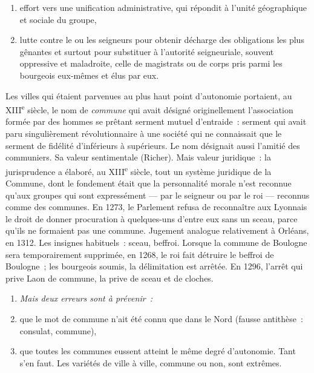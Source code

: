 \documentclass[french,twoside]{book} %
\newlength{\listmod}
\newcommand{\listhead}[1]{\hspace{-1\listmod}\emph{#1}}
\begin{document}
\begin{enumerate}[itemsep=0pt,]
\item effort vers une unification administrative, qui répondit à l’unité géographique et sociale du groupe,
\item lutte contre le ou les seigneurs pour obtenir décharge des obligations les plus gênantes et surtout pour substituer à l’autorité seigneuriale, souvent oppressive et maladroite, celle de magistrats ou de corps pris parmi les bourgeois eux-mêmes et élus par eux.
\end{enumerate}

\noindent Les villes qui étaient parvenues au plus haut point d’autonomie portaient, au XIII\textsuperscript{e} siècle, le nom de {\itshape commune} qui avait désigné originellement l’association formée par des hommes se prêtant serment mutuel d’entraide : serment qui avait paru singulièrement révolutionnaire à une société qui ne connaissait que le serment de fidélité d’inférieurs à supérieurs. Le nom désignait aussi l’amitié des communiers. Sa valeur sentimentale (Richer). Mais valeur juridique : la jurisprudence a élaboré, au XIII\textsuperscript{e} siècle, tout un système juridique de la Commune, dont le fondement était que la personnalité morale n’est reconnue qu’aux groupes qui sont expressément — par le seigneur ou par le roi — reconnus comme des communes. En 1273, le Parlement refusa de reconnaître aux Lyonnais le droit de donner procuration à quelques-uns d’entre eux sans un sceau, parce qu’ils ne formaient pas une commune. Jugement analogue relativement à Orléans, en 1312. Les insignes habituels : sceau, beffroi. Lorsque la commune de Boulogne sera temporairement supprimée, en 1268, le roi fait détruire le beffroi de Boulogne ; les bourgeois soumis, la délimitation est arrêtée. En 1296, l’arrêt qui prive Laon de commune, la prive de sceau et de cloches.\par

\begin{enumerate}[itemsep=0pt,]
\item[]\listhead{Mais deux erreurs sont à prévenir :}
\item que le mot de commune n’ait été connu que dans le Nord (fausse antithèse : consulat, commune),
\item que toutes les communes eussent atteint le même degré d’autonomie. Tant s’en faut. Les variétés de ville à ville, commune ou non, sont extrêmes.
\end{enumerate}
\end{document}
